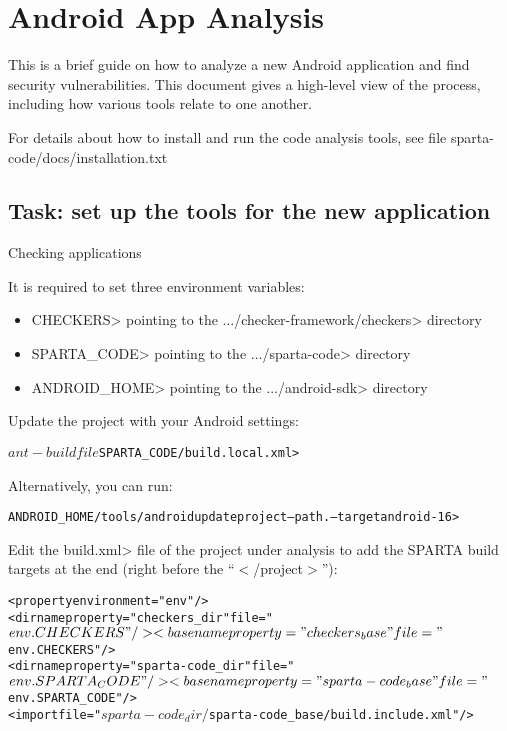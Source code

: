 \htmlhr
\chapter{Android App Analysis\label{appanalysis}}

This is a brief guide on how to analyze a new Android application and
find security vulnerabilities. This document gives a high-level view
of the process, including how various tools relate to one another.

For details about how to install and run the code analysis tools, see file
sparta-code/docs/installation.txt


\section{Task:  set up the tools for the new application}

Checking applications

It is required to set three environment variables:

\begin{itemize}
\item
\<CHECKERS> pointing to the
\<.../checker-framework/checkers> directory

\item
\<SPARTA\_CODE> pointing to the \<.../sparta-code> directory

\item
\<ANDROID\_HOME> pointing to the \<.../android-sdk> directory

\end{itemize}


Update the project with your Android settings:

\begin{alltt}
$ ant -buildfile $SPARTA_CODE/build.local.xml>
\end{alltt}

Alternatively, you can run:

\begin{alltt}
$ $ANDROID_HOME/tools/android update project --path . --target android-16>
\end{alltt}

Edit the \<build.xml> file of the project under analysis to add the
SPARTA build targets at the end (right before the ``$<$/project$>$''):

\begin{alltt}
<property environment="env"/>
<dirname property="checkers_dir" file="${env.CHECKERS}"/>
<basename property="checkers_base" file="${env.CHECKERS}"/>
<dirname property="sparta-code_dir" file="${env.SPARTA_CODE}"/>
<basename property="sparta-code_base" file="${env.SPARTA_CODE}"/>
<import file="${sparta-code_dir}/${sparta-code_base}/build.include.xml"/>
\end{alltt}



